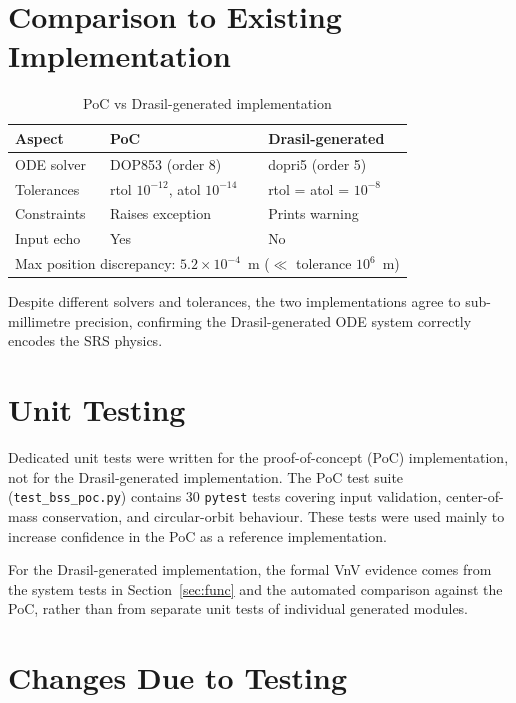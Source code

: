 \documentclass[12pt, titlepage]{article}
\begin{document}
\section{Comparison to Existing Implementation}\label{sec:comparison}

\begin{table}[h!]
\centering
\renewcommand{\arraystretch}{1.3}
\begin{tabularx}{\textwidth}{l X X}
\toprule
\textbf{Aspect} & \textbf{PoC} & \textbf{Drasil-generated} \\
\midrule
ODE solver    & DOP853 (order 8) & dopri5 (order 5) \\
Tolerances    & rtol $10^{-12}$, atol $10^{-14}$ & rtol = atol = $10^{-8}$ \\
Constraints   & Raises exception & Prints warning \\
Input echo    & Yes & No \\
\midrule
\multicolumn{3}{l}{Max position discrepancy: $5.2\times10^{-4}$~m
  ($\ll$ tolerance $10^{6}$~m)} \\
\bottomrule
\end{tabularx}
\caption{PoC vs Drasil-generated implementation}
\label{tab:impl-compare}
\end{table}

Despite different solvers and tolerances, the two implementations agree to
sub-millimetre precision, confirming the Drasil-generated ODE system correctly
encodes the SRS physics.

\section{Unit Testing}\label{sec:unit}

Dedicated unit tests were written for the proof-of-concept (PoC)
implementation, not for the Drasil-generated implementation. The PoC test
suite (\texttt{test\_bss\_poc.py}) contains 30 \texttt{pytest} tests covering
input validation, center-of-mass conservation, and circular-orbit behaviour.
These tests were used mainly to increase confidence in the PoC as a reference
implementation.

For the Drasil-generated implementation, the formal VnV evidence comes from the
system tests in Section~\ref{sec:func} and the automated comparison against the
PoC, rather than from separate unit tests of individual generated modules.

\section{Changes Due to Testing}\label{sec:changes}
\end{document}
